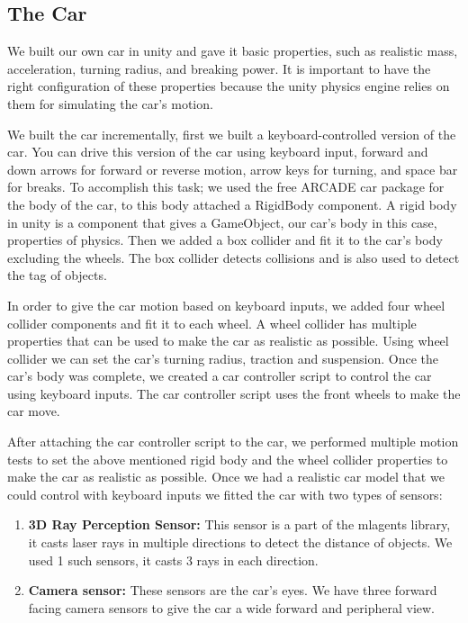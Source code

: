 \documentclass[conference]{IEEEtran}
\begin{document}
\subsection{The Car}
We built our own car in unity and gave it basic properties, such as realistic mass, acceleration, turning radius, and breaking power. It is important to have the right configuration of these properties because the unity physics engine relies on them for simulating the car's motion. 
\par
We built the car incrementally, first we built a keyboard-controlled version of the car. You can drive this version of the car using keyboard input, forward and down arrows for forward or reverse motion, arrow keys for turning, and space bar for breaks. To accomplish this task; we used the free ARCADE car package for the body of the car, to this body attached a RigidBody component. A rigid body in unity is a component that gives a GameObject, our car's body in this case, properties of physics. Then we added a box collider and fit it to the car's body excluding the wheels. The box collider detects collisions and is also used to detect the tag of objects.
\par

In order to give the car motion based on keyboard inputs, we added four wheel collider components and fit it to each wheel. A wheel collider has multiple properties that can be used to make the car as realistic as possible. Using wheel collider we can set the car's turning radius, traction and suspension.
Once the car's body was complete, we created a car controller script to control the car using keyboard inputs. The car controller script uses the front wheels to make the car move. 
\par

After attaching the car controller script to the car, we performed multiple motion tests to set the above mentioned rigid body and the wheel collider properties to make the car as realistic as possible. Once we had a realistic car model that we could control with keyboard inputs we fitted the car with two types of sensors:
\begin{enumerate}
    \item \textbf{3D Ray Perception Sensor:} This sensor is a part of the mlagents library, it casts laser rays in multiple directions to detect the distance of objects. We used 1 such sensors, it casts 3 rays in each direction.
    \item \textbf{Camera sensor:} These sensors are the car's eyes. We have three forward facing camera sensors to give the car a wide forward and peripheral view.
\end{enumerate}
\end{document}
